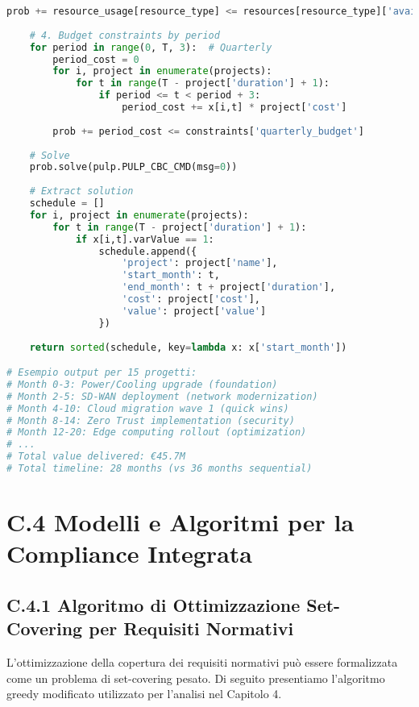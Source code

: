 \begin{lstlisting}[language=Python, caption=Algoritmo di Scheduling con Vincoli]
            prob += resource_usage[resource_type] <= resources[resource_type]['available']
    
    # 4. Budget constraints by period
    for period in range(0, T, 3):  # Quarterly
        period_cost = 0
        for i, project in enumerate(projects):
            for t in range(T - project['duration'] + 1):
                if period <= t < period + 3:
                    period_cost += x[i,t] * project['cost']
        
        prob += period_cost <= constraints['quarterly_budget']
    
    # Solve
    prob.solve(pulp.PULP_CBC_CMD(msg=0))
    
    # Extract solution
    schedule = []
    for i, project in enumerate(projects):
        for t in range(T - project['duration'] + 1):
            if x[i,t].varValue == 1:
                schedule.append({
                    'project': project['name'],
                    'start_month': t,
                    'end_month': t + project['duration'],
                    'cost': project['cost'],
                    'value': project['value']
                })
    
    return sorted(schedule, key=lambda x: x['start_month'])

# Esempio output per 15 progetti:
# Month 0-3: Power/Cooling upgrade (foundation)
# Month 2-5: SD-WAN deployment (network modernization)  
# Month 4-10: Cloud migration wave 1 (quick wins)
# Month 8-14: Zero Trust implementation (security)
# Month 12-20: Edge computing rollout (optimization)
# ...
# Total value delivered: €45.7M
# Total timeline: 28 months (vs 36 months sequential)
\end{lstlisting}

\section{C.4 Modelli e Algoritmi per la Compliance Integrata}

\subsection{C.4.1 Algoritmo di Ottimizzazione Set-Covering per Requisiti Normativi}

L'ottimizzazione della copertura dei requisiti normativi può essere formalizzata come un problema di set-covering pesato. Di seguito presentiamo l'algoritmo greedy modificato utilizzato per l'analisi nel Capitolo 4.

